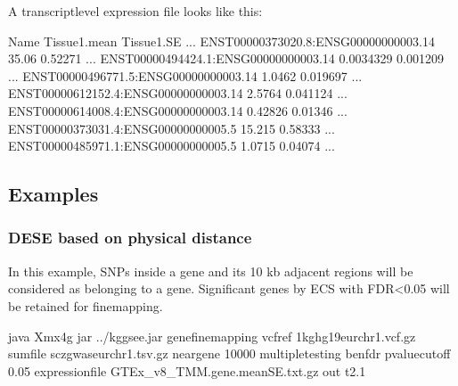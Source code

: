 \documentclass[letterpaper,10pt,english,openany,oneside]{sphinxmanual}
\begin{document}
\sphinxAtStartPar
A transcript\sphinxhyphen{}level expression file looks like this:

\begin{sphinxVerbatim}[commandchars=\\\{\}]
Name                                   Tissue1.mean   Tissue1.SE     ...
ENST00000373020.8:ENSG00000000003.14   35.06          0.52271        ...
ENST00000494424.1:ENSG00000000003.14   0.0034329      0.001209       ...
ENST00000496771.5:ENSG00000000003.14   1.0462         0.019697       ...
ENST00000612152.4:ENSG00000000003.14   2.5764         0.041124       ...
ENST00000614008.4:ENSG00000000003.14   0.42826        0.01346        ...
ENST00000373031.4:ENSG00000000005.5    15.215         0.58333        ...
ENST00000485971.1:ENSG00000000005.5    1.0715         0.04074        ...
\end{sphinxVerbatim}


\newpage
\subsection{Examples}
\label{\detokenize{detailed_document:id3}}

\subsubsection{DESE based on physical distance}
\label{\detokenize{detailed_document:dese-based-on-physical-distance}}
\sphinxAtStartPar
In this example, SNPs inside a gene and its 10 kb adjacent regions will be considered as belonging to a gene. Significant genes by ECS with FDR\textless{}0.05 will be retained for fine\sphinxhyphen{}mapping.

\begin{sphinxVerbatim}[commandchars=\\\{\}]
java \PYGZhy{}Xmx4g \PYGZhy{}jar ../kggsee.jar 
  \PYGZhy{}\PYGZhy{}gene\PYGZhy{}finemapping 
  \PYGZhy{}\PYGZhy{}vcf\PYGZhy{}ref 1kg\PYGZus{}hg19\PYGZus{}eur\PYGZus{}chr1.vcf.gz 
  \PYGZhy{}\PYGZhy{}sum\PYGZhy{}file scz\PYGZus{}gwas\PYGZus{}eur\PYGZus{}chr1.tsv.gz 
  \PYGZhy{}\PYGZhy{}neargene 10000 
  \PYGZhy{}\PYGZhy{}multiple\PYGZhy{}testing benfdr 
  \PYGZhy{}\PYGZhy{}p\PYGZhy{}value\PYGZhy{}cutoff 0.05 
  \PYGZhy{}\PYGZhy{}expression\PYGZhy{}file GTEx_v8_TMM.gene.meanSE.txt.gz 
  \PYGZhy{}\PYGZhy{}out t2.1
\end{sphinxVerbatim}
\end{document}
